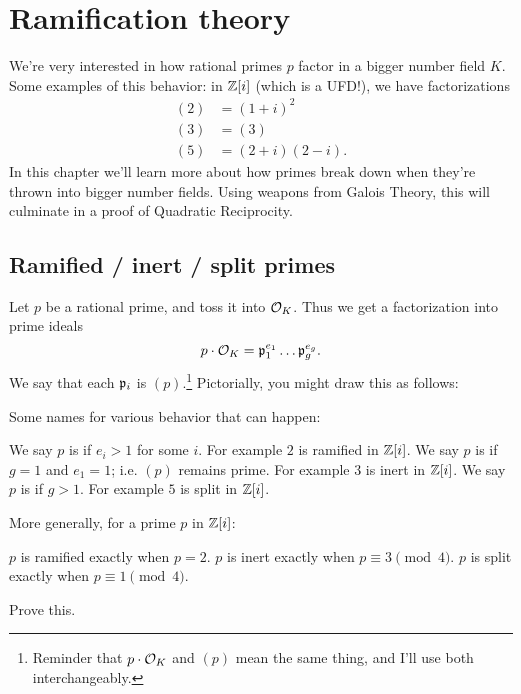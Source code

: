 \chapter{Ramification theory}
We're very interested in how rational primes $p$ factor in a bigger number field $K$.
Some examples of this behavior: in $\mathbb Z[i]$ (which is a UFD!), we have factorizations
\begin{align*}
	(2) &= (1+i)^2 \\
	(3) &= (3) \\
	(5) &= (2+i)(2-i).
\end{align*}
In this chapter we'll learn more about how primes break down when they're thrown into bigger number fields.
Using weapons from Galois Theory, this will culminate in a proof of Quadratic Reciprocity.

\section{Ramified / inert / split primes}

Let $p$ be a rational prime, and toss it into $\mathcal O_K$.
Thus we get a factorization into prime ideals
\[ p \cdot \mathcal O_K = \mathfrak p_1^{e_1} \dots \mathfrak p_g^{e_g}. \]
We say that each $\mathfrak p_i$ is  $(p)$.\footnote{%
	Reminder that $p \cdot \mathcal O_K$ and $(p)$ mean the same thing, and I'll use both interchangeably.}
Pictorially, you might draw this as follows:
\begin{center}
\end{center}
Some names for various behavior that can happen:
\begin{itemize}
	\ii We say $p$ is  if $e_i > 1$ for some $i$.
	For example $2$ is ramified in $\mathbb Z[i]$.
	\ii We say $p$ is  if $g=1$ and $e_1=1$; i.e. $(p)$ remains prime.
	For example $3$ is inert in $\mathbb Z[i]$.
	\ii We say $p$ is  if $g > 1$.
	For example $5$ is split in $\mathbb Z[i]$.
\end{itemize}
\begin{ques}
	More generally, for a prime $p$ in $\mathbb Z[i]$:
	\begin{itemize}
		\ii $p$ is ramified exactly when $p = 2$.
		\ii $p$ is inert exactly when $p \equiv 3 \pmod 4$.
		\ii $p$ is split exactly when $p \equiv 1 \pmod 4$.
	\end{itemize}
	Prove this.
\end{ques}

